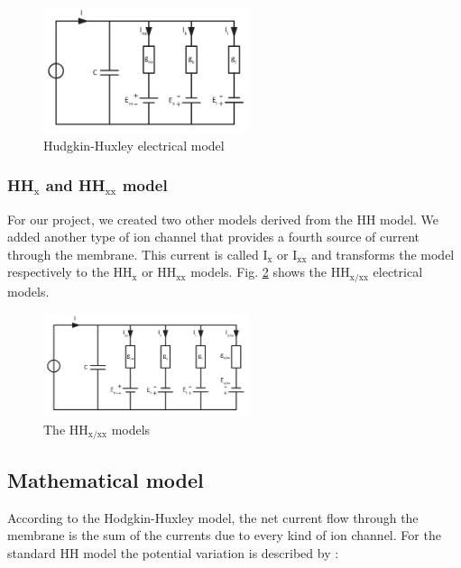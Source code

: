 \documentclass[a4paper, 10pt, conference]{ieeeconf}      %
\begin{document}
\begin{figure} [h!]
\begin{center}
\includegraphics[width=6cm]{figures/HH_model.pdf}
\caption{Hudgkin-Huxley electrical model}
\label{fig:HH_model}
\end{center}
\end{figure}






\subsubsection*{HH$_\text{x}$ and HH$_\text{xx}$ model}
For our project, we created two other models derived from the HH model. We added another type of ion channel that provides a fourth source of current through the membrane. This current is called I$_\text{x}$ or I$_\text{xx}$ and transforms the model respectively to the HH$_\text{x}$ or HH$_\text{xx}$ models. Fig. \ref{fig:HHx_model} shows the HH$_\text{x/xx}$ electrical models.

\begin{figure}
\begin{center}
\includegraphics[width=6cm]{figures/HHx_model.pdf}
\caption{The HH$_\text{x/xx}$ models}
\label{fig:HHx_model}
\end{center}
\end{figure}






\subsection{Mathematical model}
According to the Hodgkin-Huxley model, the net current flow through the membrane is the sum of the currents due to every kind of ion channel. For the standard HH model the potential variation is described by :
\end{document}
